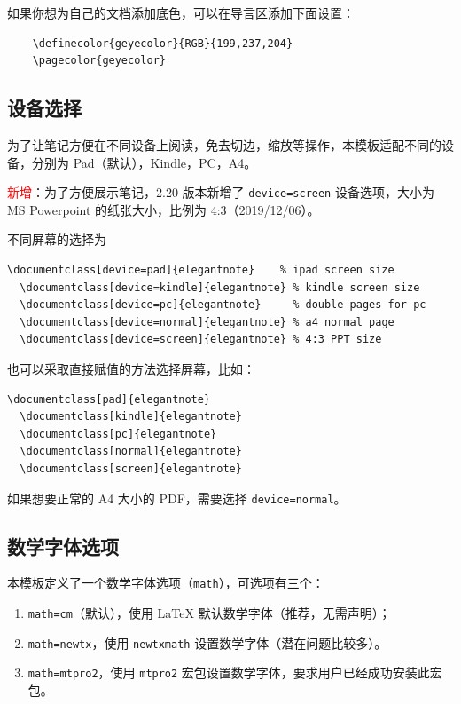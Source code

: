 \begin{remark}
  如果你想为自己的文档添加底色，可以在导言区添加下面设置：
  \begin{lstlisting}
    \definecolor{geyecolor}{RGB}{199,237,204}
    \pagecolor{geyecolor}
  \end{lstlisting}
\end{remark}


\subsection{设备选择}

为了让笔记方便在不同设备上阅读，免去切边，缩放等操作，本模板适配不同的设备，分别为 Pad（默认），Kindle，PC，A4。

\textcolor{red}{\kaishu 新增}：为了方便展示笔记，2.20 版本新增了 \lstinline{device=screen} 设备选项，大小为 MS Powerpoint 的纸张大小，比例为 4:3（2019/12/06）。

不同屏幕的选择为
\begin{lstlisting}[frame=none]  
  \documentclass[device=pad]{elegantnote}    % ipad screen size
  \documentclass[device=kindle]{elegantnote} % kindle screen size
  \documentclass[device=pc]{elegantnote}     % double pages for pc 
  \documentclass[device=normal]{elegantnote} % a4 normal page
  \documentclass[device=screen]{elegantnote} % 4:3 PPT size
\end{lstlisting}
\begin{note}
也可以采取直接赋值的方法选择屏幕，比如：
\end{note}
\begin{lstlisting}[frame=none]  
  \documentclass[pad]{elegantnote}
  \documentclass[kindle]{elegantnote}
  \documentclass[pc]{elegantnote}
  \documentclass[normal]{elegantnote}
  \documentclass[screen]{elegantnote}
\end{lstlisting}

\begin{note}
  如果想要正常的 A4 大小的 PDF，需要选择 \lstinline{device=normal}。
\end{note}


\subsection{数学字体选项}

本模板定义了一个数学字体选项（\lstinline{math}），可选项有三个：
\begin{enumerate}
  \item \lstinline{math=cm}（默认），使用 \LaTeX{} 默认数学字体（推荐，无需声明）；
  \item \lstinline{math=newtx}，使用 \lstinline{newtxmath} 设置数学字体（潜在问题比较多）。
  \item \lstinline{math=mtpro2}，使用 \lstinline{mtpro2} 宏包设置数学字体，要求用户已经成功安装此宏包。
\end{enumerate}


